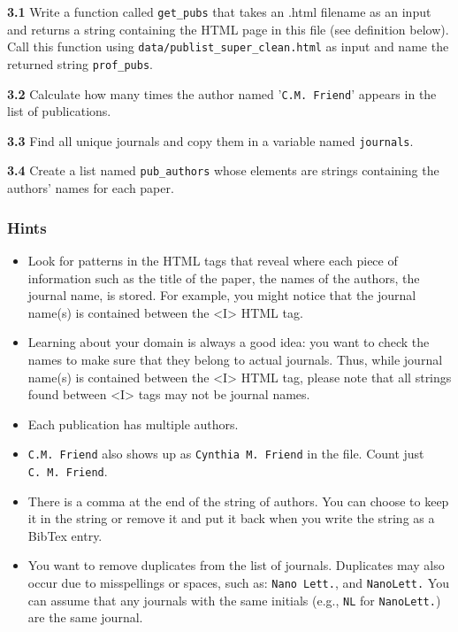 \documentclass[11pt]{article}
\providecommand{\tightlist}{%
      \setlength{\itemsep}{0pt}\setlength{\parskip}{0pt}}
\begin{document}
\textbf{3.1} Write a function called \texttt{get\_pubs} that takes an
.html filename as an input and returns a string containing the HTML page
in this file (see definition below). Call this function using
\texttt{data/publist\_super\_clean.html} as input and name the returned
string \texttt{prof\_pubs}.

\textbf{3.2} Calculate how many times the author named
'\texttt{C.M.\ Friend}' appears in the list of publications.

\textbf{3.3} Find all unique journals and copy them in a variable named
\texttt{journals}.

\textbf{3.4} Create a list named \texttt{pub\_authors} whose elements
are strings containing the authors' names for each paper.

\subsubsection{Hints}\label{hints}

\begin{itemize}
\tightlist
\item
  Look for patterns in the HTML tags that reveal where each piece of
  information such as the title of the paper, the names of the authors,
  the journal name, is stored. For example, you might notice that the
  journal name(s) is contained between the \textless{}I\textgreater{}
  HTML tag.
\item
  Learning about your domain is always a good idea: you want to check
  the names to make sure that they belong to actual journals. Thus,
  while journal name(s) is contained between the
  \textless{}I\textgreater{} HTML tag, please note that all strings
  found between \textless{}I\textgreater{} tags may not be journal
  names.
\item
  Each publication has multiple authors.
\item
  \texttt{C.M.\ Friend} also shows up as \texttt{Cynthia\ M.\ Friend} in
  the file. Count just \texttt{C.\ M.\ Friend}.
\item
  There is a comma at the end of the string of authors. You can choose
  to keep it in the string or remove it and put it back when you write
  the string as a BibTex entry.
\item
  You want to remove duplicates from the list of journals. Duplicates
  may also occur due to misspellings or spaces, such as:
  \texttt{Nano\ Lett.}, and \texttt{NanoLett.} You can assume that any
  journals with the same initials (e.g., \texttt{NL} for
  \texttt{NanoLett.}) are the same journal.
\end{itemize}
\end{document}
